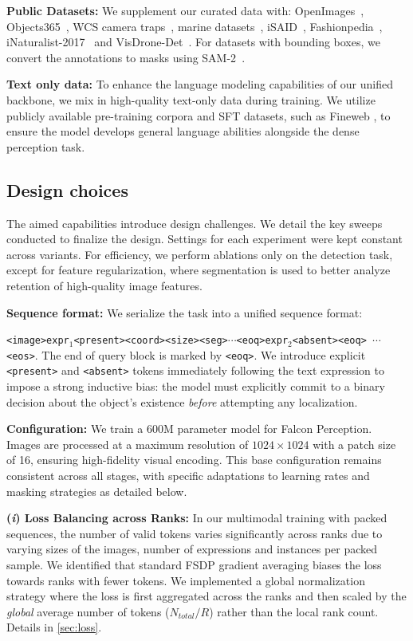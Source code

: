 \noindent \textbf{Public Datasets:} We supplement our curated data with: OpenImages~\citep{kuznetsova2020open}, Objects365~\citep{shao2019objects365}, WCS camera traps~\citep{lila_bc_wcscameratraps}, marine datasets~\citep{jansen2022underwater,saleh2020realistic,lila_bc_river_herring}, iSAID~\citep{waqas2019isaid}, Fashionpedia~\citep{jia2020fashionpedia}, iNaturalist-2017~\citep{van2017inaturalist} and VisDrone-Det~\citep{zhu2021detection}. For datasets with bounding boxes, we convert the annotations to masks using SAM-2~\citep{sam2}.

\noindent \textbf{Text only data:}
To enhance the language modeling capabilities of our unified backbone, we mix in high-quality text-only data during training. We utilize publicly available pre-training corpora and SFT datasets, such as Fineweb \citep{penedo2024fineweb}, to ensure the model develops general language abilities alongside the dense perception task.

\subsection{Design choices}
The aimed capabilities  introduce design challenges. We detail the key sweeps conducted to finalize the design. Settings for each experiment were kept constant across variants. For efficiency, we perform ablations only on the detection task, except for feature regularization, where segmentation is used to better analyze retention of high-quality image features. 

\noindent \textbf{Sequence format:} We serialize the task into a unified sequence format: 

\texttt{<image>expr$_1$<present><coord><size><seg>$\cdots$<eoq>expr$_2$<absent><eoq> $\cdots$ <eos>}. The end of query block is marked by \texttt{<eoq>}. We introduce explicit \texttt{<present>} and \texttt{<absent>} tokens immediately following the text expression to impose a strong inductive bias: the model must explicitly commit to a binary decision about the object's existence \textit{before} attempting any localization. 

\noindent \textbf{Configuration:} We train a 600M parameter model for Falcon Perception. Images are processed at a maximum resolution of $1024 \times 1024$ with a patch size of 16, ensuring high-fidelity visual encoding. This base configuration remains consistent across all stages, with specific adaptations to learning rates and masking strategies as detailed below.


\noindent \textbf{(\textit{i}) Loss Balancing across Ranks:}
In our multimodal training with packed sequences, the number of valid tokens varies significantly across ranks due to varying sizes of the images, number of expressions and instances per packed sample. We identified that standard FSDP gradient averaging biases the loss towards ranks with fewer tokens. We implemented a global normalization strategy where the loss is first aggregated across the ranks and then scaled by the \textit{global} average number of tokens ($N_{total}/R$) rather than the local rank count. Details in \ref{sec:loss}.

